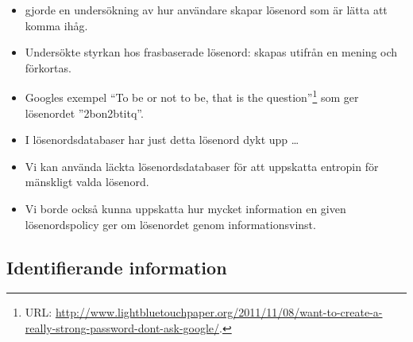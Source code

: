 \documentclass{beamer}
\begin{document}
\begin{frame}
  \begin{itemize}
    \item \citet{Kuo2006hso} gjorde en undersökning av hur användare skapar 
      lösenord som är lätta att komma ihåg.

    \item Undersökte styrkan hos frasbaserade lösenord:
      skapas utifrån en mening och förkortas.

    \item Googles exempel \enquote{To be or not to be, that is the 
        question}\footnote{%
        URL\@: 
        \protect\url{http://www.lightbluetouchpaper.org/2011/11/08/want-to-create-a-really-strong-password-dont-ask-google/}.
      } som ger lösenordet ''2bon2btitq''.

    \item I lösenordsdatabaser har just detta lösenord dykt upp \dots

  \end{itemize}
\end{frame}

\begin{frame}
  \begin{itemize}
    \item Vi kan använda läckta lösenordsdatabaser för att uppskatta entropin 
      för mänskligt valda lösenord.

    \item Vi borde också kunna uppskatta hur mycket information en given 
      lösenordspolicy ger om lösenordet genom informationsvinst.

  \end{itemize}
\end{frame}

\subsection{Identifierande information}
\end{document}
